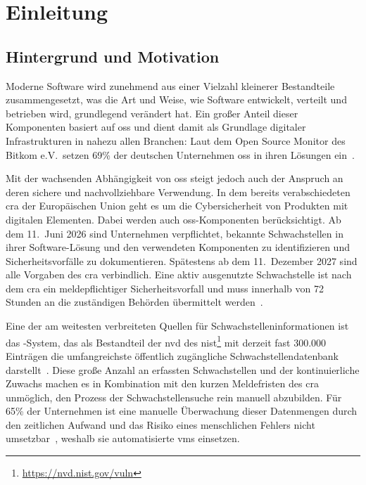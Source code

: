 \chapter{Einleitung}\label{ch:einleitung}


\section{Hintergrund und Motivation}\label{sec:hintergrund-motivation}

Moderne Software wird zunehmend aus einer Vielzahl kleinerer Bestandteile zusammengesetzt, was die Art und Weise, wie Software entwickelt, verteilt und betrieben wird, grundlegend verändert hat.
Ein großer Anteil dieser Komponenten basiert auf \acrfull{oss} und dient damit als Grundlage digitaler Infrastrukturen in nahezu allen Branchen:
Laut dem Open Source Monitor des Bitkom e.V.\ setzen 69\% der deutschen Unternehmen \acrshort{oss} in ihren Lösungen ein\ \autocite{OpenSourceMonitorWintergerst}.

Mit der wachsenden Abhängigkeit von \acrshort{oss} steigt jedoch auch der Anspruch an deren sichere und nachvollziehbare Verwendung.
In dem bereits verabschiedeten \acrfull{cra} der Europäischen Union geht es um die Cybersicherheit von Produkten mit digitalen Elementen.
Dabei werden auch \acrshort{oss}-Komponenten berücksichtigt.
Ab dem 11.\ Juni 2026 sind Unternehmen verpflichtet, bekannte Schwachstellen in ihrer Software-Lösung und den verwendeten Komponenten zu identifizieren und Sicherheitsvorfälle zu dokumentieren.
Spätestens ab dem 11.\ Dezember 2027 sind alle Vorgaben des \acrshort{cra} verbindlich.
Eine aktiv ausgenutzte Schwachstelle ist nach dem \acrshort{cra} ein meldepflichtiger Sicherheitsvorfall und muss innerhalb von 72 Stunden an die zuständigen Behörden übermittelt werden\ \autocite{eu2024cra}.

Eine der am weitesten verbreiteten Quellen für Schwachstelleninformationen ist das -System, das als Bestandteil der \acrfull{nvd} des \acrfull{nist}\footnote{\url{https://nvd.nist.gov/vuln}} mit derzeit fast \num{300.000} Einträgen die umfangreichste öffentlich zugängliche Schwachstellendatenbank darstellt\ \autocite{nvd12mai2025dashboard}.
Diese große Anzahl an erfassten Schwachstellen und der kontinuierliche Zuwachs machen es in Kombination mit den kurzen Meldefristen des \acrshort{cra} unmöglich, den Prozess der Schwachstellensuche rein manuell abzubilden.
Für 65\% der Unternehmen ist eine manuelle Überwachung dieser Datenmengen durch den zeitlichen Aufwand und das Risiko eines menschlichen Fehlers nicht umsetzbar\ \autocite{OpenSourceMonitorWintergerst}, weshalb sie automatisierte \acrfull{vms} einsetzen.

